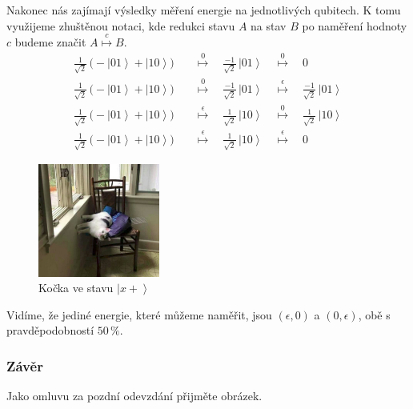 \documentclass{article}
\newcommand{\ket}[1]{\left| #1 \right>}
\begin{document}
Nakonec nás zajímají výsledky měření energie na jednotlivých qubitech. K tomu využijeme zhuštěnou notaci, kde redukci stavu $A$ na stav $B$ po naměření hodnoty $c$ budeme značit $A \stackrel{c}{\mapsto} B$.
\begin{align*}
    \frac{1}{\sqrt{2}} \, \big(-\ket{01} + \ket{10} \big)
    & \quad\stackrel{0}{\mapsto}\quad
    \frac{-1}{\sqrt{2}} \, \ket{01}
    \quad\stackrel{0}{\mapsto}\quad 0
    \\[5pt]
    \frac{1}{\sqrt{2}} \, \big(-\ket{01} + \ket{10} \big)
    & \quad\stackrel{0}{\mapsto}\quad
    \frac{-1}{\sqrt{2}} \, \ket{01}
    \quad\stackrel{\displaystyle \epsilon}{\mapsto}\quad
    \frac{-1}{\sqrt{2}} \, \ket{01}
    \\[5pt]
    \frac{1}{\sqrt{2}} \, \big(-\ket{01} + \ket{10} \big)
    & \quad\stackrel{\displaystyle \epsilon}{\mapsto}\quad
    \frac{1}{\sqrt{2}} \, \ket{10}
    \quad\stackrel{0}{\mapsto}\quad
    \frac{1}{\sqrt{2}} \, \ket{10}
    \\[5pt]
    \frac{1}{\sqrt{2}} \, \big(-\ket{01} + \ket{10} \big)
    & \quad\stackrel{\displaystyle \epsilon}{\mapsto}\quad
    \frac{1}{\sqrt{2}} \, \ket{10}
    \quad\stackrel{\displaystyle \epsilon}{\mapsto}\quad 0
\end{align*}
\begin{figure}
    \vspace{-1\baselineskip}
    \centering
    \includegraphics[width=4cm]{kocka.png}
    \caption{Kočka ve stavu $\ket{x+}$}
\end{figure}
Vidíme, že jediné energie, které můžeme naměřit, jsou $(\epsilon, 0)$ a $(0, \epsilon)$, obě s pravděpodobností $50\,\%$.



\subsubsection*{Závěr}
Jako omluvu za pozdní odevzdání přijměte obrázek.
\end{document}
